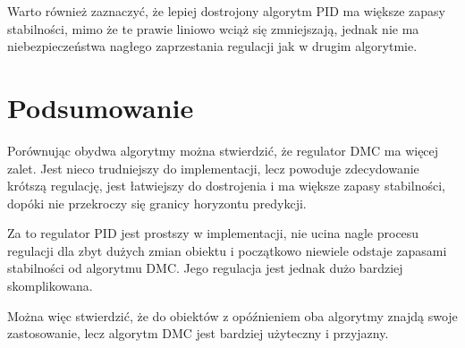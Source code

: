\documentclass[fleqn]{article}
\begin{document}
Warto również zaznaczyć, że lepiej dostrojony algorytm PID ma większe zapasy stabilności, mimo że te prawie liniowo wciąż się zmniejszają, jednak nie ma niebezpieczeństwa nagłego zaprzestania regulacji jak w drugim algorytmie.

\section{Podsumowanie}

Porównując obydwa algorytmy można stwierdzić, że regulator DMC ma więcej zalet. Jest nieco trudniejszy do implementacji, lecz powoduje zdecydowanie krótszą regulację, jest łatwiejszy do dostrojenia i ma większe zapasy stabilności, dopóki nie przekroczy się granicy horyzontu predykcji.

Za to regulator PID jest prostszy w implementacji, nie ucina nagle procesu regulacji dla zbyt dużych zmian obiektu i początkowo niewiele odstaje zapasami stabilności od algorytmu DMC. Jego regulacja jest jednak dużo bardziej skomplikowana.

Można więc stwierdzić, że do obiektów z opóźnieniem oba algorytmy znajdą swoje zastosowanie, lecz algorytm DMC jest bardziej użyteczny i przyjazny.
\end{document}
